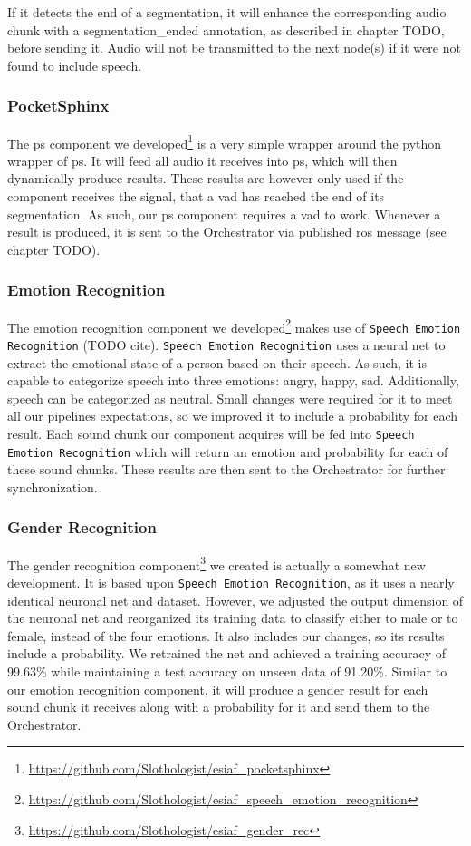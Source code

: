 If it detects the end of a segmentation, it will enhance the corresponding audio chunk with a segmentation\_ended annotation, as described in chapter TODO, before sending it.
Audio will not be transmitted to the next node(s) if it were not found to include speech.

\subsubsection{PocketSphinx}
\label{main:components:ps}
The \gls{ps} component we developed\footnote{\url{https://github.com/Slothologist/esiaf_pocketsphinx}} is a very simple wrapper around the python wrapper of \gls{ps}.
It will feed all audio it receives into \gls{ps}, which will then dynamically produce results.
These results are however only used if the component receives the signal, that a \gls{vad} has reached the end of its segmentation.
As such, our \gls{ps} component requires a \gls{vad} to work.
Whenever a result is produced, it is sent to the Orchestrator via published \gls{ros} message (see chapter TODO).

\subsubsection{Emotion Recognition}
\label{main:components:emotion}
The emotion recognition component we developed\footnote{\url{https://github.com/Slothologist/esiaf_speech_emotion_recognition}} makes use of \texttt{Speech Emotion Recognition} (TODO cite).
\texttt{Speech Emotion Recognition} uses a neural net to extract the emotional state of a person based on their speech.
As such, it is capable to categorize speech into three emotions: angry, happy, sad.
Additionally, speech can be categorized as neutral.
Small changes were required for it to meet all our pipelines expectations, so we improved it to include a probability for each result. %
Each sound chunk our component acquires will be fed into \texttt{Speech Emotion Recognition} which will return an emotion and probability for each of these sound chunks.
These results are then sent to the Orchestrator for further synchronization.

\subsubsection{Gender Recognition}
\label{main:components:gender}
The gender recognition component\footnote{\url{https://github.com/Slothologist/esiaf_gender_rec}} we created is actually a somewhat new development.
It is based upon \texttt{Speech Emotion Recognition}, as it uses a nearly identical neuronal net and dataset.
However, we adjusted the output dimension of the neuronal net and reorganized its training data to classify either to male or to female, instead of the four emotions.
It also includes our changes, so its results include a probability.
We retrained the net and achieved a training accuracy of 99.63\% while maintaining a test accuracy on unseen data of 91.20\%.
Similar to our emotion recognition component, it will produce a gender result for each sound chunk it receives along with a probability for it and send them to the Orchestrator.

